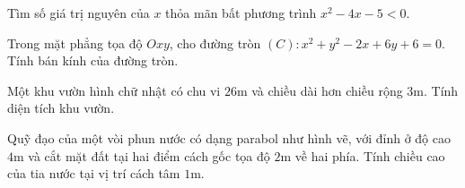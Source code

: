
\NQuestion Tìm số giá trị nguyên của $x$ thỏa mãn bất phương trình $x^2-4x-5<0$.

\NQuestion Trong mặt phẳng tọa độ $Oxy$, cho đường tròn $(C):x^2+y^2-2x+6y+6=0$. Tính bán kính của đường tròn.

\NQuestion Một khu vườn hình chữ nhật có chu vi $26$m và chiều dài hơn chiều rộng $3$m. Tính diện tích khu vườn.

\NQuestion Quỹ đạo của một vòi phun nước có dạng parabol như hình vẽ, với đỉnh ở độ cao $4$m và cắt mặt đất tại hai điểm cách gốc tọa độ $2$m về hai phía. Tính chiều cao của tia nước tại vị trí cách tâm $1$m.

\begin{center}

\end{center}

